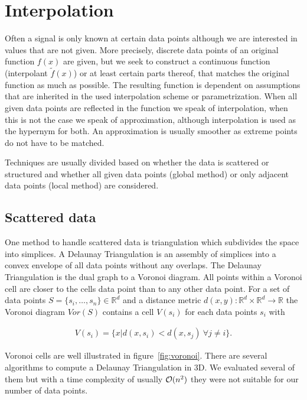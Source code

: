 \section{Interpolation}

Often a signal is only known at certain data points although we are interested in values that are not given. More precisely, discrete data points of an original function $f(x)$ are given, but we seek to construct a continuous function (interpolant $\widetilde{f}(x)$) or at least certain parts thereof, that matches the original function as much as possible. The resulting function is dependent on assumptions that are inherited in the used interpolation scheme or parametrization. When all given data points are reflected in the function we speak of interpolation, when this is not the case we speak of approximation, although interpolation is used as the hypernym for both. An approximation is usually smoother as extreme points do not have to be matched.

Techniques are usually divided based on whether the data is scattered or structured and whether all given data points (global method) or only adjacent data points (local method) are considered.

\subsection{Scattered data}

One method to handle scattered data is triangulation which subdivides the space into simplices. A Delaunay Triangulation is an assembly of simplices into a convex envelope of all data points without any overlaps. The Delaunay Triangulation is the dual graph to a Voronoi diagram. All points within a Voronoi cell are closer to the cells data point than to any other data point. For a set of data points $S = \{s_i, \dots, s_n \} \in \mathbb{R}^d$ and a distance metric $d(x, y):\mathbb{R}^d \times \mathbb{R}^d \rightarrow \mathbb{R}$ the Voronoi diagram $Vor(S)$ contains a cell $V(s_i)$ for each data points $s_i$ with

\begin{align}
V(s_i) = \{x | d(x,s_i) < d(x,s_j)~\forall j \neq i\}.
\end{align}

Voronoi cells are well illustrated in figure~\ref{fig:voronoi}. There are several algorithms to compute a Delaunay Triangulation in 3D. We evaluated several of them but with a time complexity of usually $\mathcal{O}(n^2)$ they were not suitable for our number of data points. 

